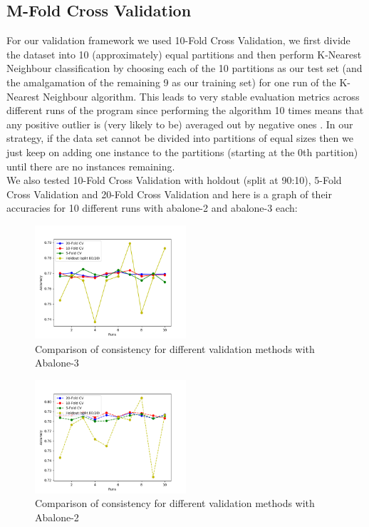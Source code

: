 \subsection{M-Fold Cross Validation}

For our validation framework we used 10-Fold Cross Validation, we first divide the dataset into 10 (approximately) equal partitions and then perform K-Nearest Neighbour classification by choosing each of the 10 partitions as our test set (and the amalgamation of the remaining 9 as our training set) for one run of the K-Nearest Neighbour algorithm. This leads to very stable evaluation metrics across different runs of the program since performing the algorithm 10 times means that any positive outlier is (very likely to be) averaged out by negative ones
. In our strategy, if the data set cannot be divided into partitions of equal sizes then we just keep on adding one instance to the partitions (starting at the 0th partition) until there are no instances remaining.\\

We also tested 10-Fold Cross Validation with holdout (split at 90:10), 5-Fold Cross Validation and 20-Fold Cross Validation and here is a graph of their accuracies for 10 different runs with abalone-2 and abalone-3 each:



\begin{figure}[!htb]
\centering

\includegraphics[width=0.5\textwidth]{consistency_comparison_3.png}
\caption{Comparison of consistency for different validation methods with Abalone-3}
\end{figure}

\begin{figure}[!htb]
\centering

\includegraphics[width=0.5\textwidth]{consistency_comparison_2.png}
\caption{Comparison of consistency for different validation methods with Abalone-2}
\end{figure}

